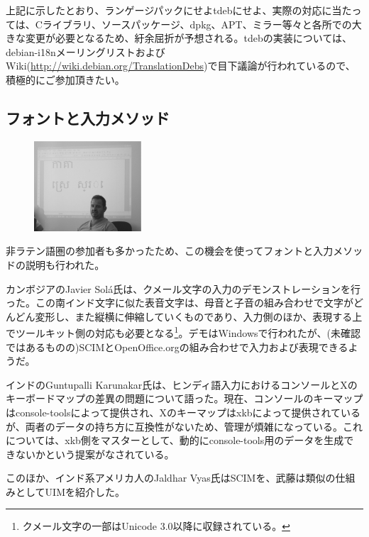 \documentclass[mingoth,a4paper]{jsarticle}
\begin{document}

上記に示したとおり、ランゲージパックにせよtdebにせよ、実際の対応に当たっては、Cライブラリ、ソースパッケージ、dpkg、APT、ミラー等々と各所での大きな変更が必要となるため、紆余屈折が予想される。tdebの実装については、debian-i18nメーリングリストおよびWiki(\url{http://wiki.debian.org/TranslationDebs})で目下議論が行われているので、積極的にご参加頂きたい。


\subsection{フォントと入力メソッド}
\label{sec:extremadura-font-im}

\begin{figure}\includegraphics[width=4cm]{image200610/javier.eps}\end{figure}

非ラテン語圏の参加者も多かったため、この機会を使ってフォントと入力メソッドの説明も行われた。

カンボジアのJavier Sol\'{a}氏は、クメール文字の入力のデモンストレーションを行った。この南インド文字に似た表音文字は、母音と子音の組み合わせで文字がどんどん変形し、また縦横に伸縮していくものであり、入力側のほか、表現する上でツールキット側の対応も必要となる\footnote{クメール文字の一部はUnicode 3.0以降に収録されている。}。デモはWindowsで行われたが、(未確認ではあるものの)SCIMとOpenOffice.orgの組み合わせで入力および表現できるようだ。


インドのGuntupalli Karunakar氏は、ヒンディ語入力におけるコンソールとXのキーボードマップの差異の問題について語った。現在、コンソールのキーマップはconsole-toolsによって提供され、Xのキーマップはxkbによって提供されているが、両者のデータの持ち方に互換性がないため、管理が煩雑になっている。これについては、xkb側をマスターとして、動的にconsole-tools用のデータを生成できないかという提案がなされている。

このほか、インド系アメリカ人のJaldhar Vyas氏はSCIMを、武藤は類似の仕組みとしてUIMを紹介した。
\end{document}
